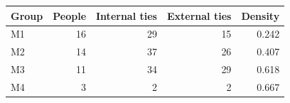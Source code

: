\begin{tabular}{lrrrr}
\toprule
Group & People & Internal ties & External ties & Density \\
\midrule
M1 & 16 & 29 & 15 & 0.242 \\
M2 & 14 & 37 & 26 & 0.407 \\
M3 & 11 & 34 & 29 & 0.618 \\
M4 & 3 & 2 & 2 & 0.667 \\
\bottomrule
\end{tabular}
